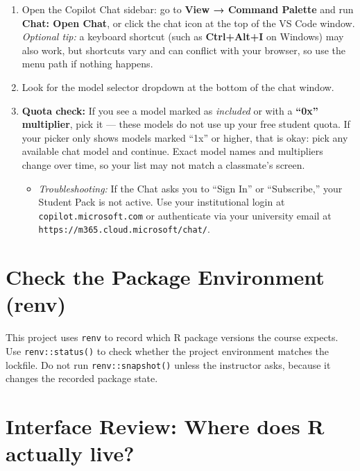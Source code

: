 \documentclass[
  letterpaper,
  DIV=11,
  numbers=noendperiod,
  oneside]{scrreprt}
\providecommand{\tightlist}{%
  \setlength{\itemsep}{0pt}\setlength{\parskip}{0pt}}
\begin{document}
\begin{enumerate}
\def\labelenumi{\arabic{enumi}.}
\tightlist
\item
  Open the Copilot Chat sidebar: go to \textbf{View → Command Palette}
  and run \textbf{Chat: Open Chat}, or click the chat icon at the top of
  the VS Code window. \emph{Optional tip:} a keyboard shortcut (such as
  \textbf{Ctrl+Alt+I} on Windows) may also work, but shortcuts vary and
  can conflict with your browser, so use the menu path if nothing
  happens.
\item
  Look for the model selector dropdown at the bottom of the chat window.
\item
  \textbf{Quota check:} If you see a model marked as \emph{included} or
  with a \textbf{``0x'' multiplier}, pick it --- these models do not use
  up your free student quota. If your picker only shows models marked
  ``1x'' or higher, that is okay: pick any available chat model and
  continue. Exact model names and multipliers change over time, so your
  list may not match a classmate's screen.

  \begin{itemize}
  \tightlist
  \item
    \emph{Troubleshooting:} If the Chat asks you to ``Sign In'' or
    ``Subscribe,'' your Student Pack is not active. Use your
    institutional login at \texttt{copilot.microsoft.com} or
    authenticate via your university email at
    \texttt{https://m365.cloud.microsoft/chat/}.
  \end{itemize}
\end{enumerate}

\section{Check the Package Environment
(renv)}\label{check-the-package-environment-renv}

This project uses \texttt{renv} to record which R package versions the
course expects. Use \texttt{renv::status()} to check whether the project
environment matches the lockfile. Do not run \texttt{renv::snapshot()}
unless the instructor asks, because it changes the recorded package
state.

\section{Interface Review: Where does R actually
live?}\label{interface-review-where-does-r-actually-live}
\end{document}
